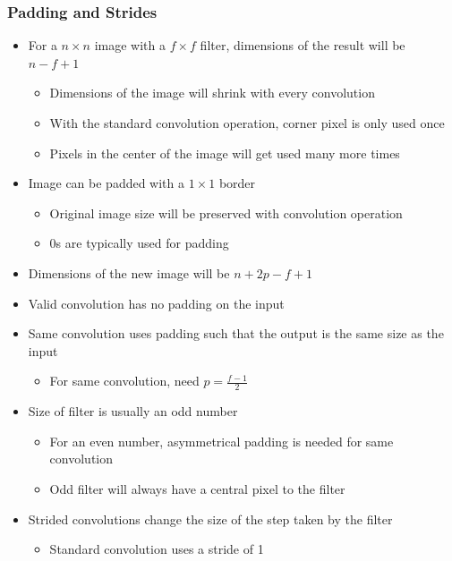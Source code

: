 \documentclass[12pt, letterpaper]{article}
\begin{document}
    \subsubsection{Padding and Strides}
    \begin{itemize}
        \item For a $n\times n$ image with a $f\times f$ filter, dimensions of the result will be $n-f+1$
        \begin{itemize}
            \item Dimensions of the image will shrink with every convolution
            \item With the standard convolution operation, corner pixel is only used once
            \item Pixels in the center of the image will get used many more times 
        \end{itemize}
        \item Image can be padded with a $1\times 1$ border
        \begin{itemize}
            \item Original image size will be preserved with convolution operation
            \item 0s are typically used for padding
        \end{itemize}
        \item Dimensions of the new image will be $n+2p-f+1$
        \item Valid convolution has no padding on the input
        \item Same convolution uses padding such that the output is the same size as the input
        \begin{itemize}
            \item For same convolution, need $p=\frac{f-1}{2}$
        \end{itemize}
        \item Size of filter is usually an odd number
        \begin{itemize}
            \item For an even number, asymmetrical padding is needed for same convolution
            \item Odd filter will always have a central pixel to the filter 
        \end{itemize}
        \item Strided convolutions change the size of the step taken by the filter
        \begin{itemize}
            \item Standard convolution uses a stride of 1

\end{itemize}
\end{itemize}
\end{document}
